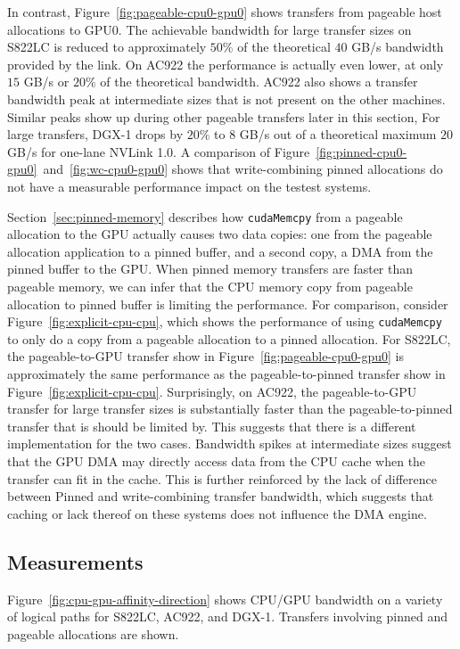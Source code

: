 In contrast, Figure~\ref{fig:pageable-cpu0-gpu0} shows transfers from pageable host allocations to GPU0.
The achievable bandwidth for large transfer sizes on S822LC is reduced to approximately $50\%$ of the theoretical $40$ GB/s bandwidth provided by the link.
On AC922 the performance is actually even lower, at only $15$ GB/s or $20\%$ of the theoretical bandwidth.
AC922 also shows a transfer bandwidth peak at intermediate sizes that is not present on the other machines.
Similar peaks show up during other pageable transfers later in this section, 
For large transfers, DGX-1 drops by $20\%$ to $8$ GB/s out of a theoretical maximum $20$ GB/s for one-lane NVLink 1.0.
A comparison of Figure~\ref{fig:pinned-cpu0-gpu0}~and~\ref{fig:wc-cpu0-gpu0} shows that write-combining pinned allocations do not have a measurable performance impact on the testest systems.

Section~\ref{sec:pinned-memory} describes how \texttt{cudaMemcpy} from a pageable allocation to the GPU actually causes two data copies: one from the pageable allocation application to a pinned buffer, and a second copy, a DMA from the pinned buffer to the GPU.
When pinned memory transfers are faster than pageable memory, we can infer that the CPU memory copy from pageable allocation to pinned buffer is limiting the performance.
For comparison, consider Figure~\ref{fig:explicit-cpu-cpu}, which shows the performance of using \texttt{cudaMemcpy} to only do a copy from a pageable allocation to a pinned allocation.
For S822LC, the pageable-to-GPU transfer show in Figure~\ref{fig:pageable-cpu0-gpu0} is approximately the same performance as the pageable-to-pinned transfer show in Figure~\ref{fig:explicit-cpu-cpu}.
Surprisingly, on AC922, the pageable-to-GPU transfer for large transfer sizes is substantially faster than the pageable-to-pinned transfer that is should be limited by.
This suggests that there is a different implementation for the two cases.
Bandwidth spikes at intermediate sizes suggest that the GPU DMA may directly access data from the CPU cache when the transfer can fit in the cache.
This is further reinforced by the lack of difference between Pinned and write-combining transfer bandwidth, which suggests that caching or lack thereof on these systems does not influence the DMA engine.

\subsection{Measurements}

Figure~\ref{fig:cpu-gpu-affinity-direction} shows CPU/GPU bandwidth on a variety of logical paths for S822LC, AC922, and DGX-1.
Transfers involving pinned and pageable allocations are shown.

